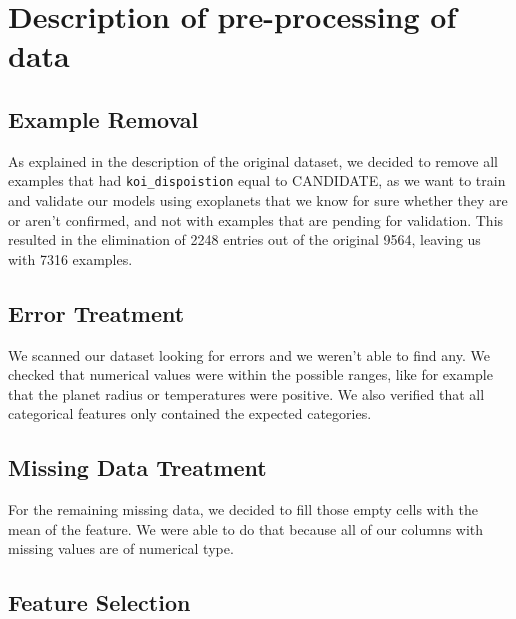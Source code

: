 
\section{Description of pre-processing of data}%
\label{sec:desc-prep}


\subsection{Example Removal}

As explained in the description of the original dataset, we decided to remove all examples
that had \texttt{koi\_dispoistion} equal to CANDIDATE, as we want to train and validate our
models using exoplanets that we know for sure whether they are or aren't confirmed, and not
with examples that are pending for validation. This resulted in the elimination of 2248 entries
out of the original 9564, leaving us with 7316 examples.

\subsection{Error Treatment}

We scanned our dataset looking for errors and we weren't able to find any. We checked
that numerical values were within the possible ranges, like for example that the
planet radius or temperatures were positive. We also verified that all categorical 
features only contained the expected categories.

\subsection{Missing Data Treatment}

For the remaining missing data, we decided to fill those empty cells with the mean
of the feature. We were able to do that because all of our columns with missing values
are of numerical type.

\subsection{Feature Selection}%
\label{sub:feature_removal}

